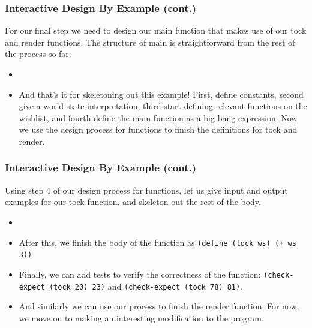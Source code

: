 \documentclass{beamer}
\begin{document}

\begin{frame}
  \frametitle{Interactive Design By Example (cont.)}
  For our final step we need to design our main function that makes
  use of our tock and render functions. The structure of main is
  straightforward from the rest of the process so far. 
  \begin{itemize}
  \item<2-> \mainProg
  \item<3-> And that's it for skeletoning out this example! First, define constants,
    second give a world state interpretation, third start defining relevant
    functions on the wishlist, and fourth define the main function as a
    big bang expression. Now we use the design process for functions to finish
    the definitions for tock and render.
  \end{itemize}
\end{frame}


\begin{frame}
  \frametitle{Interactive Design By Example (cont.)}
  Using step 4 of our design process for functions, let us give input
  and output examples for our tock function. and skeleton out the rest of the body.
  \begin{itemize}
  \item<2-> \tockSkeleton
  \item<3-> After this, we finish the body of the function as
    \texttt{(define (tock ws) (+ ws 3))}
  \item<4-> Finally, we can add tests to verify the correctness of the function:
    \texttt{(check-expect (tock 20) 23)} and \texttt{(check-expect (tock 78) 81)}.
  \item<5-> And similarly we can use our process to finish the render function.
    For now, we move on to making an interesting modification to the program.
  \end{itemize}  
\end{frame}
\end{document}
